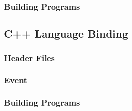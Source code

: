 \subsubsection{Building Programs}

\subsection{C++ Language Binding}
%

%

\subsubsection{Header Files}
\subsubsection{Event}
\subsubsection{Building Programs}